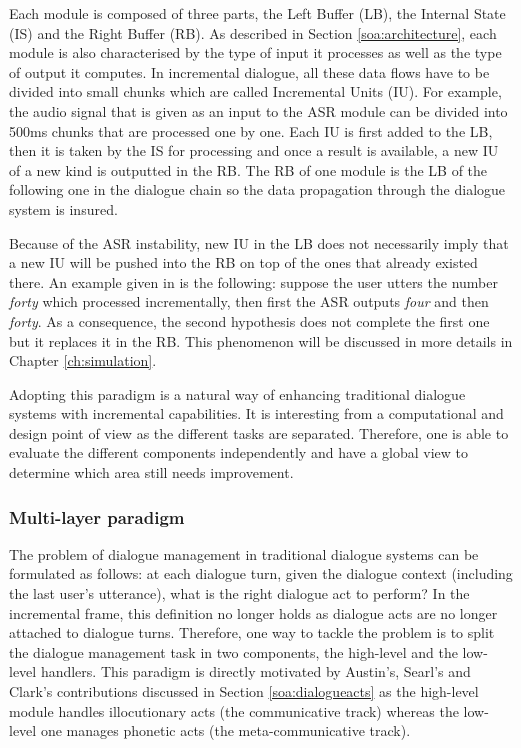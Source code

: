 Each module is composed of three parts, the Left Buffer (LB), the Internal State (IS) and the Right Buffer (RB). As described in Section \ref{soa:architecture}, each module is also characterised by the type of input it processes as well as the type of output it computes. In incremental dialogue, all these data flows have to be divided into small chunks which are called Incremental Units (IU). For example, the audio signal that is given as an input to the ASR module can be divided into 500ms chunks that are processed one by one. Each IU is first added to the LB, then it is taken by the IS for processing and once a result is available, a new IU of a new kind is outputted in the RB. The RB of one module is the LB of the following one in the dialogue chain so the data propagation through the dialogue system is insured.

Because of the ASR instability, new IU in the LB does not necessarily imply that a new IU will be pushed into the RB on top of the ones that already existed there. An example given in \cite{Schlangen2011} is the following: suppose the user utters the number \textit{forty} which processed incrementally, then first the ASR outputs \textit{four} and then \textit{forty}. As a consequence, the second hypothesis does not complete the first one but it replaces it in the RB. This phenomenon will be discussed in more details in Chapter \ref{ch:simulation}.

Adopting this paradigm is a natural way of enhancing traditional dialogue systems with incremental capabilities. It is interesting from a computational and design point of view as the different tasks are separated. Therefore, one is able to evaluate the different components independently \cite{Baumann2011} and have a global view to determine which area still needs improvement.

\subsubsection{Multi-layer paradigm}

The problem of dialogue management in traditional dialogue systems can be formulated as follows: at each dialogue turn, given the dialogue context (including the last user's utterance), what is the right dialogue act to perform? In the incremental frame, this definition no longer holds as dialogue acts are no longer attached to dialogue turns. Therefore, one way to tackle the problem is to split the dialogue management task in two components, the high-level and the low-level handlers. This paradigm is directly motivated by Austin's, Searl's and Clark's contributions discussed in Section \ref{soa:dialogueacts} as the high-level module handles illocutionary acts (the communicative track) whereas the low-level one manages phonetic acts (the meta-communicative track).

